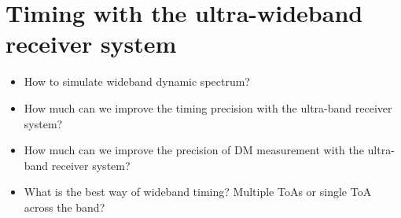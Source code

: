 \documentclass[useAMS,usenatbib]{mn2e}
\begin{document}


\section{Timing with the ultra-wideband receiver system}

\begin{itemize}
\item How to simulate wideband dynamic spectrum?
\item How much can we improve the timing precision with the ultra-band receiver system?
\item How much can we improve the precision of DM measurement with the ultra-band receiver system?
\item What is the best way of wideband timing? Multiple ToAs or single ToA across the band?
\end{itemize}
\end{document}
